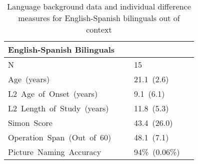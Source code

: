 %
\begin{table}[hptb]
\begin{center}
\begin{tabular}{|l|l|} \hline
\multicolumn{1}{|l|}{English-Spanish Bilinguals}&\multicolumn{1}{l|}{}\\ \hline
N~~~~~~~~~~~~~~~~~~~~~~~~~~~&~15~~~~~~~~~~~~\\ 
Age~(years)~~~~~~~~~~~~~~~~~&~21.1~(2.6)~~~~\\ 
L2~Age~of~Onset~(years)~~~~~&~9.1~(6.1)~~~~~\\ 
L2~Length~of~Study~(years)~~&~11.8~(5.3)~~~~\\ 
Simon~Score~~~~~~~~~~~~~~~~~&~43.4~(26.0)~~~\\ 
Operation~Span~(Out~of~60)~~&~48.1~(7.1)~~~~\\ 
Picture~Naming~Accuracy~~~~~&~94\%~(0.06\%)~\\ 
\hline
\end{tabular}
\caption{Language background data and individual difference measures for English-Spanish bilinguals out of context}\label{es_lhq_id}
\end{center}

 






\end{table}
